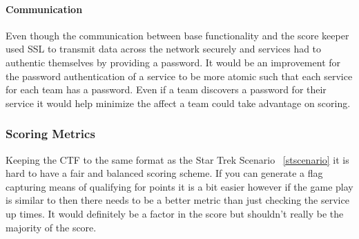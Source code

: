 \documentclass[10pt]{article}
\begin{document}
\paragraph*{Communication}
Even though the communication between base functionality and the score keeper used
SSL to transmit data across the network securely and services had to authentic themselves
by providing a password. It would be an improvement for the password authentication of
a service to be more atomic such that each service for each team has a password. Even if
a team discovers a password for their service it would help minimize the affect a team
could take advantage on scoring.

\subsubsection{Scoring Metrics}
Keeping the CTF to the same format as the Star Trek Scenario ~\ref{stscenario} it is
hard to have a fair and balanced scoring scheme. If you can generate a flag
capturing means of qualifying for points it is a bit easier however if the game play 
is similar to then there needs to be a better metric than just checking the
service up times. It would definitely be a factor in the score but shouldn't
really be the majority of the score.
\end{document}
